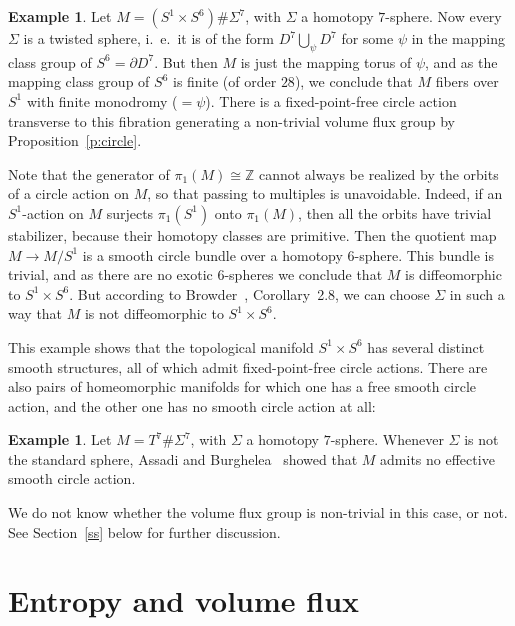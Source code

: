 \documentclass[12pt]{amsart}
\theoremstyle{definition}
\newtheorem{example}[theorem]{Example}
\theoremstyle{remark}
\def\bZ{{\mathbb Z}}
\begin{document}
\begin{example}\label{ex:7D}
    Let $M = (S^{1}\times S^{6})\#\Sigma^{7}$, with $\Sigma$ a 
    homotopy $7$-sphere. Now every $\Sigma$ is a 
    twisted sphere, i.~e.~it is of the form $D^{7}\bigcup_{\psi}D^{7}$ 
    for some $\psi$ in the mapping class group of $S^{6}=\partial D^{7}$. 
    But then $M$ is just the mapping torus of $\psi$, and as the mapping 
    class group of $S^{6}$ is finite (of order $28$), we conclude that $M$ 
    fibers over $S^{1}$ with finite monodromy ($=\psi$). There is a 
    fixed-point-free circle action transverse to this fibration 
    generating a non-trivial volume flux group by 
    Proposition~\ref{p:circle}.
    
    Note that the generator of $\pi_{1}(M)\cong\bZ$ cannot always be 
    realized by the orbits of a circle action on $M$, so that passing to 
    multiples is unavoidable. Indeed, if an $S^{1}$-action on $M$  
    surjects $\pi_{1}(S^{1})$ onto $\pi_{1}(M)$, then all the orbits 
    have trivial stabilizer, because their homotopy classes are primitive. 
    Then the quotient map $M\rightarrow M/S^{1}$ is a smooth circle bundle 
    over a homotopy $6$-sphere. This bundle is trivial, and as there are 
    no exotic $6$-spheres we conclude that $M$ is diffeomorphic to 
    $S^{1}\times S^{6}$. But according to Browder~\cite{Browder}, 
    Corollary~2.8, we can choose $\Sigma$ in such a way that $M$ is 
    not diffeomorphic to $S^{1}\times S^{6}$. 
    \end{example}
    This example shows that the topological manifold $S^{1}\times S^{6}$ 
    has several distinct smooth structures, all of which admit 
    fixed-point-free circle actions. There are also pairs of homeomorphic 
    manifolds for which one has a free smooth circle action, and the other
    one has no smooth circle action at all:
    \begin{example}\label{ex:tori}
    Let $M = T^7\#\Sigma^{7}$, with $\Sigma$ a homotopy $7$-sphere. 
    Whenever $\Sigma$ is not the standard sphere, Assadi and Burghelea~\cite{AB}
    showed that $M$ admits no effective smooth circle action. 
        \end{example}
    We do not know whether the volume flux group is non-trivial in this case, or not.
See Section~\ref{ss} below for further discussion.

\section{Entropy and volume flux}\label{s:entropy}
\end{document}
